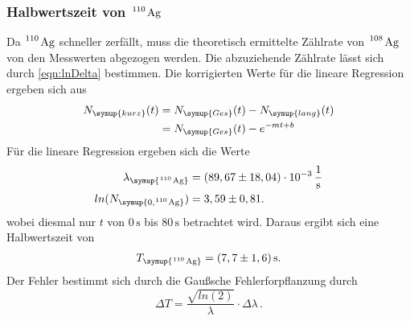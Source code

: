 \subsubsection{Halbwertszeit von $\ce{^110 Ag}$}
\label{sec:110Ag}
Da $\ce{^110 Ag}$ schneller zerfällt, muss die theoretisch ermittelte Zählrate von $\ce{^108 Ag}$ von den Messwerten
abgezogen werden. Die abzuziehende Zählrate lässt sich durch \autoref{eqn:lnDelta} bestimmen. Die korrigierten Werte
für die lineare Regression ergeben sich aus
\begin{align*}
  N_{\symup{kurz}}(t) &= N_{\symup{Ges}}(t) - N_{\symup{lang}}(t) \\
                      &= N_{\symup{Ges}}(t) - e^{-mt + b}
\end{align*}
Für die lineare Regression ergeben sich die Werte
\begin{align*}
  \lambda_{\symup{\ce{^110 Ag}}}  &= (89,67 \pm 18,04)\cdot 10^{-3}\,\frac{1}{\unit{\second}} \\
  ln(N_{\symup{0, \ce{^110 Ag}}}) &= 3,59 \pm 0,81. \\
\end{align*}
wobei diesmal nur $t$ von $0\,\unit{\second}$ bis $80\,\unit{\second}$ betrachtet wird.
Daraus ergibt sich eine Halbwertszeit von
\begin{align*}
  T_{\symup{\ce{^110 Ag}}} = (7,7 \pm 1,6)\,\unit{\second}.
\end{align*}
Der Fehler bestimmt sich durch die Gaußsche Fehlerforpflanzung durch
\begin{equation*}
  \Delta T = \frac{\sqrt{ln(2)}}{\lambda} \cdot \Delta \lambda\,. 
\end{equation*}